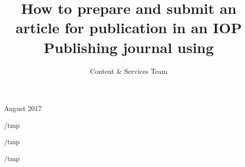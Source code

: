 \documentclass[12pt]{iopart}
\def\overleafhome{/tmp}%
\begin{document}
\title[Author guidelines for IOP Publishing journals in  \LaTeXe]{How to prepare and submit an article for
publication in an IOP Publishing journal using \LaTeXe}

\author{Content \& Services Team}

\address{IOP Publishing, Temple Circus, Temple Way, Bristol BS1 6HG, UK}
\vspace{10pt}
\begin{indented}
\item[]August 2017
\end{indented}

\ifx\homepath\overleafhome
  
\else
  
\fi

\ifx\homepath\overleafhome %
  
  
  
  
  
  
\else %
  
  
  
  
  
  
\fi

\cite{aimone_provable_2021}

%
%

\ifx\homepath\overleafhome
  \printbibliography
\else
  
  

\fi

\appendix
\end{document}
